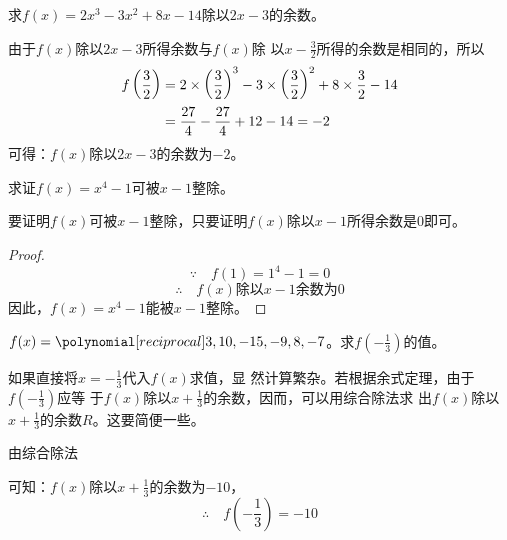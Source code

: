 \begin{example}
    求$f(x)=2x^3-3x^2+8x-14$除以$2x-3$的余数。
\end{example}

\begin{solution}
    由于$f(x)$除以$2x-3$所得余数与$f(x)$除
    以$x-\frac{3}{2}$所得的余数是相同的，所以
\[\begin{split}
f\left(\dfrac{3}{2}\right)&=2\times\left(\dfrac{3}{2}\right)^3-3\times\left(\dfrac{3}{2}\right)^2+8\times\dfrac{3}{2}-14\\
&=\dfrac{27}{4}-\dfrac{27}{4}+12-14=-2
\end{split}\]
可得：$f(x)$除以$2x-3$的余数为$-2$。
\end{solution}

\begin{example}
 求证$f(x)=x^4-1$可被$x-1$整除。   
\end{example}

\begin{analyze}
   要证明$f(x)$可被$x-1$整除，只要证明$f(x)$除以$x-1$所得余数是0即可。
\end{analyze}

\begin{proof}
\[\because\quad f(1)=1^4-1=0\]
\[\therefore\quad f(x)\text{除以}x-1\text{余数为0}\]
因此，$f(x)=x^4-1$能被$x-1$整除。
\end{proof}

\begin{example}
$f(x)=\poly{3,10,-15,-9,8,-7}$。求$f\left(-\frac{1}{3}\right)$的值。
\end{example}

\begin{note}
如果直接将$x=-\frac{1}{3}$代入$f(x)$求值，显
    然计算繁杂。若根据余式定理，由于$f\left(-\frac{1}{3}\right)$应等
    于$f(x)$除以$x+\frac{1}{3}$的余数，因而，可以用综合除法求
    出$f(x)$除以$x+\frac{1}{3}$的余数$R$。这要简便一些。
\end{note}

\begin{solution}
由综合除法
\begin{center}
    \end{center}
可知：$f(x)$除以$x+\frac{1}{3}$的余数为$-10$，
\[\therefore\quad f\left(-\frac{1}{3}\right)=-10\]
\end{solution}

